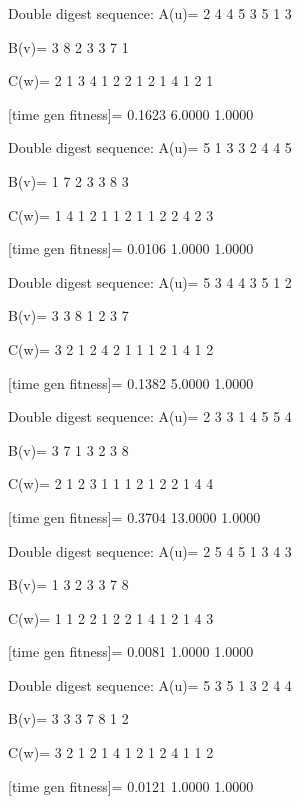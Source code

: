 Double digest sequence:
A(u)=
     2     4     4     5     3     5     1     3

B(v)=
     3     8     2     3     3     7     1

C(w)=
     2     1     3     4     1     2     2     1     2     1     4     1     2     1

[time gen fitness]=
    0.1623    6.0000    1.0000

Double digest sequence:
A(u)=
     5     1     3     3     2     4     4     5

B(v)=
     1     7     2     3     3     8     3

C(w)=
     1     4     1     2     1     1     2     1     1     2     2     4     2     3

[time gen fitness]=
    0.0106    1.0000    1.0000

Double digest sequence:
A(u)=
     5     3     4     4     3     5     1     2

B(v)=
     3     3     8     1     2     3     7

C(w)=
     3     2     1     2     4     2     1     1     1     2     1     4     1     2

[time gen fitness]=
    0.1382    5.0000    1.0000

Double digest sequence:
A(u)=
     2     3     3     1     4     5     5     4

B(v)=
     3     7     1     3     2     3     8

C(w)=
     2     1     2     3     1     1     1     2     1     2     2     1     4     4

[time gen fitness]=
    0.3704   13.0000    1.0000

Double digest sequence:
A(u)=
     2     5     4     5     1     3     4     3

B(v)=
     1     3     2     3     3     7     8

C(w)=
     1     1     2     2     1     2     2     1     4     1     2     1     4     3

[time gen fitness]=
    0.0081    1.0000    1.0000

Double digest sequence:
A(u)=
     5     3     5     1     3     2     4     4

B(v)=
     3     3     3     7     8     1     2

C(w)=
     3     2     1     2     1     4     1     2     1     2     4     1     1     2

[time gen fitness]=
    0.0121    1.0000    1.0000

